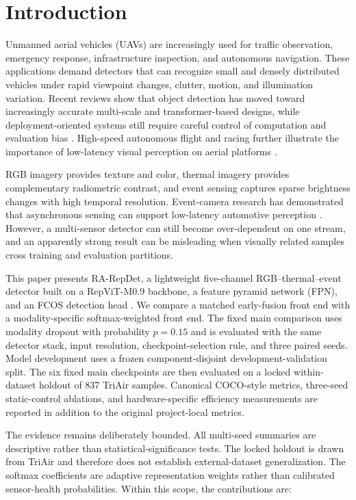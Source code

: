 
\section{Introduction}

Unmanned aerial vehicles (UAVs) are increasingly used for traffic observation, emergency response, infrastructure inspection, and autonomous navigation. These applications demand detectors that can recognize small and densely distributed vehicles under rapid viewpoint changes, clutter, motion, and illumination variation. Recent reviews show that object detection has moved toward increasingly accurate multi-scale and transformer-based designs, while deployment-oriented systems still require careful control of computation and evaluation bias \cite{Zou2023OD20Years,Han2023VisionTransformer}. High-speed autonomous flight and racing further illustrate the importance of low-latency visual perception on aerial platforms \cite{Kaufmann2023ChampionDrone,Song2023AutonomousRacing}.

RGB imagery provides texture and color, thermal imagery provides complementary radiometric contrast, and event sensing captures sparse brightness changes with high temporal resolution. Event-camera research has demonstrated that asynchronous sensing can support low-latency automotive perception \cite{Gehrig2024LowLatencyEvent}. However, a multi-sensor detector can still become over-dependent on one stream, and an apparently strong result can be misleading when visually related samples cross training and evaluation partitions.

This paper presents RA-RepDet, a lightweight five-channel RGB--thermal--event detector built on a RepViT-M0.9 backbone, a feature pyramid network (FPN), and an FCOS detection head \cite{RepViT2024,FPN2017,FCOS2019}. We compare a matched early-fusion front end with a modality-specific softmax-weighted front end. The fixed main comparison uses modality dropout with probability $p=0.15$ and is evaluated with the same detector stack, input resolution, checkpoint-selection rule, and three paired seeds. Model development uses a frozen component-disjoint development-validation split. The six fixed main checkpoints are then evaluated on a locked within-dataset holdout of 837 TriAir samples. Canonical COCO-style metrics, three-seed static-control ablations, and hardware-specific efficiency measurements are reported in addition to the original project-local metrics.

The evidence remains deliberately bounded. All multi-seed summaries are descriptive rather than statistical-significance tests. The locked holdout is drawn from TriAir and therefore does not establish external-dataset generalization. The softmax coefficients are adaptive representation weights rather than calibrated sensor-health probabilities. Within this scope, the contributions are:

